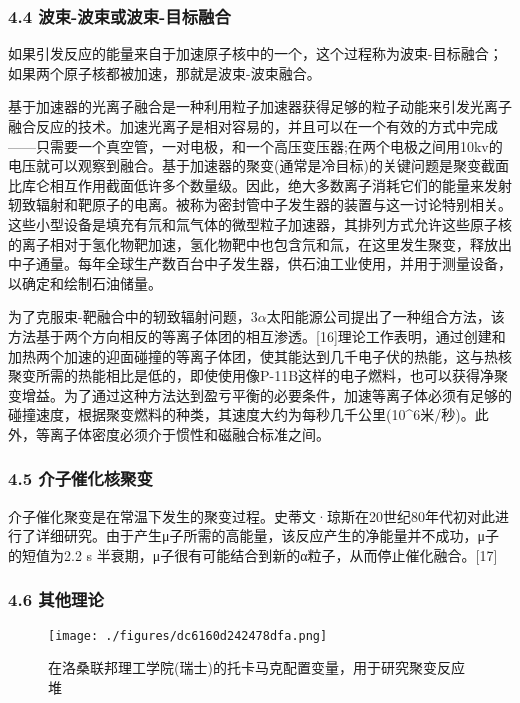 \subsubsection{4.4 波束-波束或波束-目标融合}
如果引发反应的能量来自于加速原子核中的一个，这个过程称为波束-目标融合；如果两个原子核都被加速，那就是波束-波束融合。

基于加速器的光离子融合是一种利用粒子加速器获得足够的粒子动能来引发光离子融合反应的技术。加速光离子是相对容易的，并且可以在一个有效的方式中完成——只需要一个真空管，一对电极，和一个高压变压器;在两个电极之间用10kv的电压就可以观察到融合。基于加速器的聚变(通常是冷目标)的关键问题是聚变截面比库仑相互作用截面低许多个数量级。因此，绝大多数离子消耗它们的能量来发射轫致辐射和靶原子的电离。被称为密封管中子发生器的装置与这一讨论特别相关。这些小型设备是填充有氘和氚气体的微型粒子加速器，其排列方式允许这些原子核的离子相对于氢化物靶加速，氢化物靶中也包含氘和氚，在这里发生聚变，释放出中子通量。每年全球生产数百台中子发生器，供石油工业使用，并用于测量设备，以确定和绘制石油储量。

为了克服束-靶融合中的轫致辐射问题，$3 \alpha$太阳能源公司提出了一种组合方法，该方法基于两个方向相反的等离子体团的相互渗透。[16]理论工作表明，通过创建和加热两个加速的迎面碰撞的等离子体团，使其能达到几千电子伏的热能，这与热核聚变所需的热能相比是低的，即使使用像P-11B这样的电子燃料，也可以获得净聚变增益。为了通过这种方法达到盈亏平衡的必要条件，加速等离子体必须有足够的碰撞速度，根据聚变燃料的种类，其速度大约为每秒几千公里(10^6米/秒)。此外，等离子体密度必须介于惯性和磁融合标准之间。
\subsubsection{4.5 介子催化核聚变}
介子催化聚变是在常温下发生的聚变过程。史蒂文·琼斯在20世纪80年代初对此进行了详细研究。由于产生μ子所需的高能量，该反应产生的净能量并不成功，μ子的短值为2.2 s 半衰期，μ子很有可能结合到新的α粒子，从而停止催化融合。[17]
\subsubsection{4.6 其他理论}
\begin{figure}[ht]
\centering
\texttt{[image: ./figures/dc6160d242478dfa.png]}
\caption{在洛桑联邦理工学院(瑞士)的托卡马克配置变量，用于研究聚变反应堆} \label{fig_HJB_6}
\end{figure}

